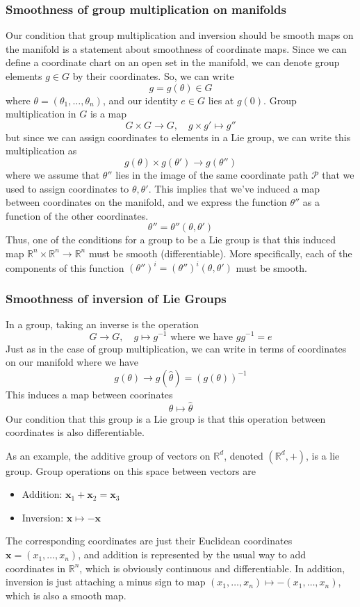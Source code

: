 \documentclass[11pt, oneside]{article}   	%
\theoremstyle{slanted}
\begin{document}
\subsubsection*{Smoothness of group multiplication on manifolds} 
Our condition that group multiplication and inversion should be smooth maps on the manifold is a statement about smoothness of coordinate maps. Since we can define a coordinate chart on an open set in the manifold, we can denote group elements $g \in G$ by their coordinates. So, we can write 
\[ 
	g  = g (\theta) \in G 
\] 
where $\theta  = ( \theta_1 , \dots, \theta_n)$, and our identity $e \in G$ lies at $g ( 0 )$. 
Group multiplication in $G$ is a map 
\[ 
	G \times G \rightarrow G, \quad g \times g' \mapsto g''  
\] but since we can assign coordinates to elements in a Lie group, we can write this multiplication as 
\[  
	g(\theta) \times g(\theta') \rightarrow g(\theta'') 
\] 
where we assume that $\theta''$ lies in the image of the same coordinate path $\mathcal{P}$ that we used to assign coordinates to $\theta, \theta' $. This implies that we've induced a map between coordinates on the manifold, and we express the function $\theta''$ as a function of the other coordinates. 
\[ 
	\theta''  = \theta''( \theta, \theta' )
\] 
Thus, one of the conditions for a group to be a Lie group is that this induced map $\mathbb{R}^n \times \mathbb{R}^n \rightarrow \mathbb{R}^n $ must be smooth (differentiable). More specifically, each of the components of this function $(\theta'')^i  = (\theta'')^i ( \theta, \theta' ) $ must be smooth. 

\subsubsection*{Smoothness of inversion of Lie Groups} 
In a group, taking an inverse is the operation 
\[ 	
	G \rightarrow G, \quad g \mapsto g^{ -1} \text{ where we have } g g^{ -1}  = e
\] 
Just as in the case of group multiplication, we can write in terms of coordinates on our manifold where we have 
\[ 
	g(\theta) \rightarrow g(\hat{\theta})  = (g(\theta))^{-1} 
\] 
This induces a map between coorinates 
\[ 
	\theta \mapsto \hat{ \theta} 
\] Our condition that this group is a Lie group is that this operation between coordinates is also differentiable. 

As an example, the additive group of vectors on $\mathbb{R}^d$, denoted $( \mathbb{R}^d, + )$, is a lie group. Group operations on this space between vectors are 
\begin{itemize} 
	\item Addition: $\mathbf{x}_1  + \mathbf{x}_2 = \mathbf{x}_3 $ 
	\item Inversion: $\mathbf{x} \mapsto  - \mathbf{x} $
\end{itemize} 
The corresponding coordinates are just their Euclidean coordinates $\mathbf{x} = (x_1, \dots, x_n ) $, and addition is represented by the usual way to add coordinates in $\mathbb{R}^n$, which is obviously continuous and differentiable. In addition, inversion is just attaching a minus sign to map $(x_1, \dots, x_n ) \mapsto  - ( x_1, \dots, x_n ) $, which is also a smooth map. 
\end{document}
